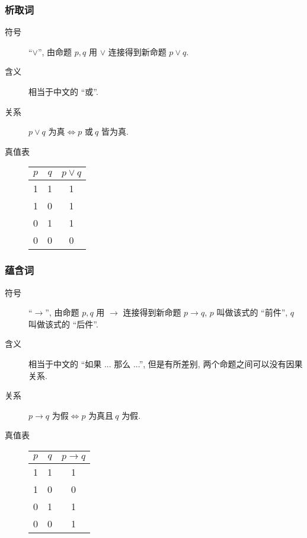\documentclass[
    mode=hazy,
    color=blue,
    device=normal,
    lang=cn
]{elegantnote}
\begin{document}
\subsubsection{析取词}
\begin{description}
    \item[符号] ``$\lor$'', 由命题 $p,q$ 用 $\lor$ 连接得到新命题 $p\lor q$.
    \item[含义] 相当于中文的 ``或''.
    \item[关系] $p\lor q\text{ 为真}\Leftrightarrow p\text{ 或}\ q\text{ 皆为真}$.
    \item[真值表]
        \begin{tabular}{c|c|c}
            $p$ & $q$ & $p\lor q$ \\
            \hline
            1   & 1   & 1         \\
            1   & 0   & 1         \\
            0   & 1   & 1         \\
            0   & 0   & 0
        \end{tabular}
\end{description}
\subsubsection{蕴含词}
\begin{description}
    \item[符号] ``$\to$'', 由命题 $p,q$ 用 $\to$ 连接得到新命题 $p\to q$, $p$ 叫做该式的 ``前件'', $q$ 叫做该式的 ``后件''.
    \item[含义] 相当于中文的 ``如果 ... 那么 ...'', 但是有所差别, 两个命题之间可以没有因果关系.
    \item[关系] $p\to q\text{ 为假}\Leftrightarrow p\text{ 为真且}\ q\text{ 为假}$.
    \item[真值表]
        \begin{tabular}{c|c|c}
            $p$ & $q$ & $p\to q$ \\
            \hline
            1   & 1   & 1        \\
            1   & 0   & 0        \\
            0   & 1   & 1        \\
            0   & 0   & 1
        \end{tabular}
\end{description}
\end{document}
